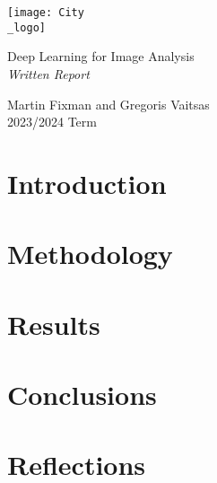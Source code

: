 \documentclass[a4paper,11pt]{article}
\begin{document}
\begin{titlepage}
	\centering
	\texttt{[image: City\\\_logo]} \\[4em]
	\begin{bfseries}
		\begin{Huge}
			Deep Learning for Image Analysis \\[35pt]
			\textsl{Written Report}
		\end{Huge}
	\end{bfseries}
	\vfill{}
	\begin{LARGE}
		\begin{sffamily}
			Martin Fixman and Gregoris Vaitsas \\[10pt]
			2023/2024 Term
		\end{sffamily}
	\end{LARGE}
\end{titlepage}

\section{Introduction}

\section{Methodology}

\section{Results}

\section{Conclusions}

\section{Reflections}


\end{document}
